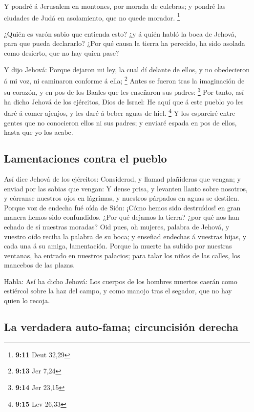  Y pondré á Jerusalem en montones, por morada de culebras;
y pondré las ciudades de Judá en asolamiento, que no quede morador.
\footnote{\textbf{9:11} Deut 32,29}

 ¿Quién es varón sabio que entienda esto? ¿y á quién habló
la boca de Jehová, para que pueda declararlo? ¿Por qué causa la tierra
ha perecido, ha sido asolada como desierto, que no hay quien pase?

 Y dijo Jehová: Porque dejaron mi ley, la cual dí delante
de ellos, y no obedecieron á mi voz, ni caminaron conforme á ella;
\footnote{\textbf{9:13} Jer 7,24}  Antes se fueron tras la
imaginación de su corazón, y en pos de los Baales que les enseñaron sus
padres: \footnote{\textbf{9:14} Jer 23,15}  Por tanto, así
ha dicho Jehová de los ejércitos, Dios de Israel: He aquí que á este
pueblo yo les daré á comer ajenjos, y les daré á beber aguas de hiel.
\footnote{\textbf{9:15} Lev 26,33}  Y los esparciré entre
gentes que no conocieron ellos ni sus padres; y enviaré espada en pos de
ellos, hasta que yo los acabe.

\hypertarget{lamentaciones-contra-el-pueblo}{%
\subsection{Lamentaciones contra el
pueblo}\label{lamentaciones-contra-el-pueblo}}

 Así dice Jehová de los ejércitos: Considerad, y llamad
plañideras que vengan; y enviad por las sabias que vengan: 
Y dense prisa, y levanten llanto sobre nosotros, y córranse nuestros
ojos en lágrimas, y nuestros párpados en aguas se destilen.
 Porque voz de endecha fué oída de Sión: ¡Cómo hemos sido
destruídos! en gran manera hemos sido confundidos. ¿Por qué dejamos la
tierra? ¿por qué nos han echado de sí nuestras moradas? 
Oid pues, oh mujeres, palabra de Jehová, y vuestro oído reciba la
palabra de su boca; y enseñad endechas á vuestras hijas, y cada una á su
amiga, lamentación.  Porque la muerte ha subido por
nuestras ventanas, ha entrado en nuestros palacios; para talar los niños
de las calles, los mancebos de las plazas.

 Habla: Así ha dicho Jehová: Los cuerpos de los hombres
muertos caerán como estiércol sobre la haz del campo, y como manojo tras
el segador, que no hay quien lo recoja.

\hypertarget{la-verdadera-auto-fama-circuncisiuxf3n-derecha}{%
\subsection{La verdadera auto-fama; circuncisión
derecha}\label{la-verdadera-auto-fama-circuncisiuxf3n-derecha}}

